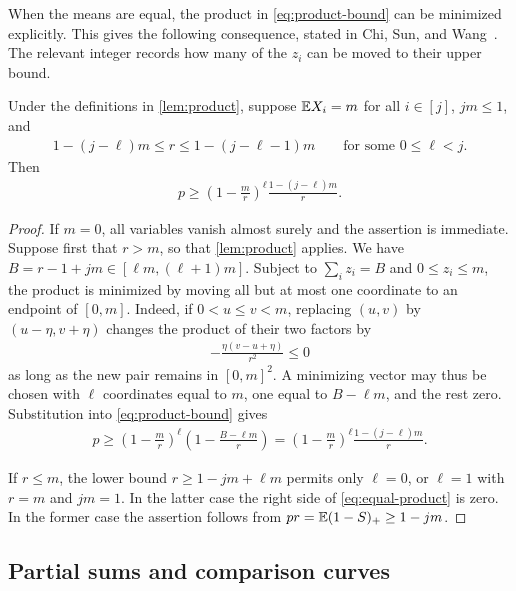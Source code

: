 When the means are equal, the product in \cref{eq:product-bound} can be minimized explicitly. This gives the following consequence, stated in Chi, Sun, and Wang~\cite[Lemma 2.13]{CSW2026}. The relevant integer records how many of the $z_i$ can be moved to their upper bound.

\begin{corollary}\label{cor:equal-product}
Under the definitions in \cref{lem:product}, suppose $\mathbb E X_i=m$ for all $i\in[j]$, $jm\le1$, and
\begin{align*}
 1-(j-\ell)m\le r\le1-(j-\ell-1)m
 \qquad\text{for some }0\le\ell<j.
\end{align*}
Then
\begin{align}\label{eq:equal-product}
 p\ge\left(1-\frac mr\right)^{\ell}\frac{1-(j-\ell)m}{r}.
\end{align}
\end{corollary}

\begin{proof}
If $m=0$, all variables vanish almost surely and the assertion is immediate. Suppose first that $r>m$, so that \cref{lem:product} applies. We have $B=r-1+jm\in[\ell m,(\ell+1)m]$. Subject to $\sum_i z_i=B$ and $0\le z_i\le m$, the product is minimized by moving all but at most one coordinate to an endpoint of $[0,m]$. Indeed, if $0<u\le v<m$, replacing $(u,v)$ by $(u-\eta,v+\eta)$ changes the product of their two factors by
\begin{align*}
 -\frac{\eta(v-u+\eta)}{r^2}\le0
\end{align*}
as long as the new pair remains in $[0,m]^2$. A minimizing vector may thus be chosen with $\ell$ coordinates equal to $m$, one equal to $B-\ell m$, and the rest zero. Substitution into \cref{eq:product-bound} gives
\begin{align*}
 p\ge\left(1-\frac mr\right)^{\ell}
 \left(1-\frac{B-\ell m}{r}\right)
 =\left(1-\frac mr\right)^{\ell}\frac{1-(j-\ell)m}{r}.
\end{align*}

If $r\le m$, the lower bound $r\ge1-jm+\ell m$ permits only $\ell=0$, or $\ell=1$ with $r=m$ and $jm=1$. In the latter case the right side of \cref{eq:equal-product} is zero. In the former case the assertion follows from $pr=\mathbb E(1-S)_+\ge1-jm$.
\end{proof}

\subsection{Partial sums and comparison curves}

